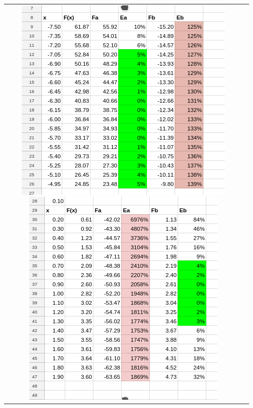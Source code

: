 \begin{Example}
\begin{tabular}{cp{}}
\begin{minipage}{0.45\textwidth}
\includegraphics[width=\textwidth]{figs01/lin_sheet_01.png} 
\includegraphics[width=\textwidth]{figs01/lin_sheet_02.png}
\end{minipage}


\end{tabular}
\end{Example}
